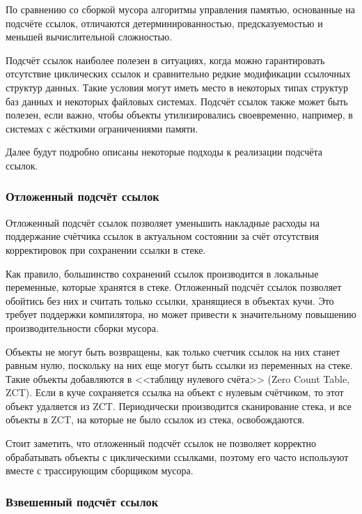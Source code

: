 По сравнению со сборкой мусора алгоритмы управления памятью, основанные на подсчёте ссылок, отличаются детерминированностью, предсказуемостью и меньшей вычислительной сложностью. \cite{cornell2} %

Подсчёт ссылок наиболее полезен в ситуациях, когда можно гарантировать отсутствие циклических ссылок и сравнительно редкие модификации ссылочных структур данных. Такие условия могут иметь место в некоторых типах структур баз данных и некоторых файловых системах. Подсчёт ссылок также может быть полезен, если важно, чтобы объекты утилизировались своевременно, например, в системах с жёсткими ограничениями памяти. \cite{recycling}

Далее будут подробно описаны некоторые подходы к реализации подсчёта ссылок. \cite{recycling}



\subsubsection{Отложенный подсчёт ссылок}

Отложенный подсчёт ссылок позволяет уменьшить накладные расходы на поддержание счётчика ссылок в актуальном состоянии за счёт отсутствия корректировок при сохранении ссылки в стеке. \cite{glossary}

Как правило, большинство сохранений ссылок производится в локальные переменные, которые хранятся в стеке. Отложенный подсчёт ссылок позволяет обойтись без них и считать только ссылки, хранящиеся в объектах кучи. Это требует поддержки компилятора, но может привести к значительному повышению производительности сборки мусора. \cite{glossary}

Объекты не могут быть возвращены, как только счетчик ссылок на них станет равным нулю, поскольку на них еще могут быть ссылки из переменных на стеке. Такие объекты добавляются в <<таблицу нулевого счёта>> (Zero Count Table, ZCT). Если в куче сохраняется ссылка на объект с нулевым счётчиком, то этот объект удаляется из ZCT. Периодически производится сканирование стека, и все объекты в ZCT, на которые не было ссылок из стека, освобождаются. \cite{glossary}

Стоит заметить, что отложенный подсчёт ссылок не позволяет корректно обрабатывать объекты с циклическими ссылками, поэтому его часто используют вместе с трассирующим сборщиком мусора. \cite{recycling}

\clearpage
\subsubsection{Взвешенный подсчёт ссылок}

